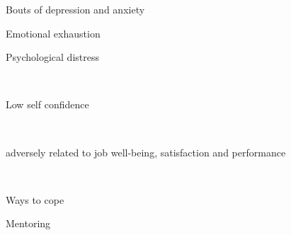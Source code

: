 \documentclass[aspectratio=169]{beamer}
\begin{document}
\begin{frame}
  \begin{center}
    \Huge Bouts of depression and anxiety
    \\ \small \cite{hh15}
  \end{center}
\end{frame}

\begin{frame}
  \begin{center}
    \Huge Emotional exhaustion
    \\ \small \cite{hh15}
  \end{center}
\end{frame}


\begin{frame}
  \begin{center}
    \Huge Psychological distress

    \\ \small \cite{hh15}
  \end{center}
\end{frame}

\begin{frame}
  \begin{center}
    \Huge Low self confidence

    \\ \small \cite{hh15}
  \end{center}
\end{frame}

\begin{frame}
  \begin{center}
    \Huge adversely related to job well-being, satisfaction and performance

    \\ \small \cite{hh15}
  \end{center}
\end{frame}

\begin{frame}
  \begin{center}
    \Huge Ways to cope
  \end{center}
\end{frame}

\begin{frame}
  \begin{center}
    \Huge Mentoring

    \\ \small \cite{hh15}
  \end{center}
\end{frame}
\end{document}
